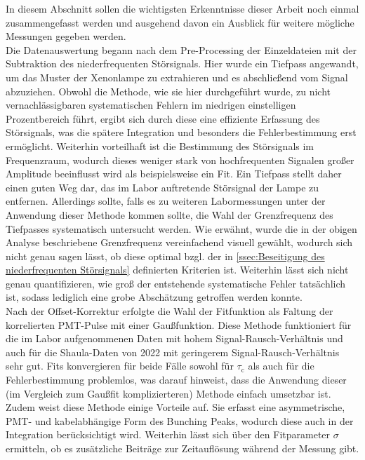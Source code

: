 In diesem Abschnitt sollen die wichtigsten Erkenntnisse dieser Arbeit noch einmal zusammengefasst werden und ausgehend davon ein Ausblick für weitere mögliche Messungen gegeben werden. \\

Die Datenauswertung begann nach dem Pre-Processing der Einzeldateien mit der Subtraktion des niederfrequenten Störsignals. 
Hier wurde ein Tiefpass angewandt, um das Muster der Xenonlampe zu extrahieren und es abschließend vom Signal abzuziehen. 
Obwohl die Methode, wie sie hier durchgeführt wurde, zu nicht vernachlässigbaren systematischen Fehlern im niedrigen einstelligen Prozentbereich führt, ergibt sich durch diese eine effiziente Erfassung des Störsignals, was die spätere Integration und besonders die Fehlerbestimmung erst ermöglicht. 
Weiterhin vorteilhaft ist die Bestimmung des Störsignals im Frequenzraum, wodurch dieses weniger stark von hochfrequenten Signalen großer Amplitude beeinflusst wird als beispielsweise ein Fit. 
Ein Tiefpass stellt daher einen guten Weg dar, das im Labor auftretende Störsignal der Lampe zu entfernen. 
Allerdings sollte, falls es zu weiteren Labormessungen unter der Anwendung dieser Methode kommen sollte, die Wahl der Grenzfrequenz des Tiefpasses systematisch untersucht werden. 
Wie erwähnt, wurde die in der obigen Analyse beschriebene Grenzfrequenz vereinfachend visuell gewählt, wodurch sich nicht genau sagen lässt, ob diese optimal bzgl. der in \autoref{ssec:Beseitigung des niederfrequenten Störsignals} definierten Kriterien ist.
Weiterhin lässt sich nicht genau quantifizieren, wie groß der entstehende systematische Fehler tatsächlich ist, sodass lediglich eine grobe Abschätzung getroffen werden konnte. \\
Nach der Offset-Korrektur erfolgte die Wahl der Fitfunktion als Faltung der korrelierten PMT-Pulse mit einer Gaußfunktion. 
Diese Methode funktioniert für die im Labor aufgenommenen Daten mit hohem Signal-Rausch-Verhältnis und auch für die Shaula-Daten von 2022 mit geringerem Signal-Rausch-Verhältnis sehr gut. 
Fits konvergieren für beide Fälle sowohl für $\tau_\mathrm{c}$ als auch für die Fehlerbestimmung problemlos, was darauf hinweist, dass die Anwendung dieser (im Vergleich zum Gaußfit komplizierteren) Methode einfach umsetzbar ist. 
Zudem weist diese Methode einige Vorteile auf. 
Sie erfasst eine asymmetrische, PMT- und kabelabhängige Form des Bunching Peaks, wodurch diese auch in der Integration berücksichtigt wird. 
Weiterhin lässt sich über den Fitparameter $\sigma$ ermitteln, ob es zusätzliche Beiträge zur Zeitauflösung während der Messung gibt. 

